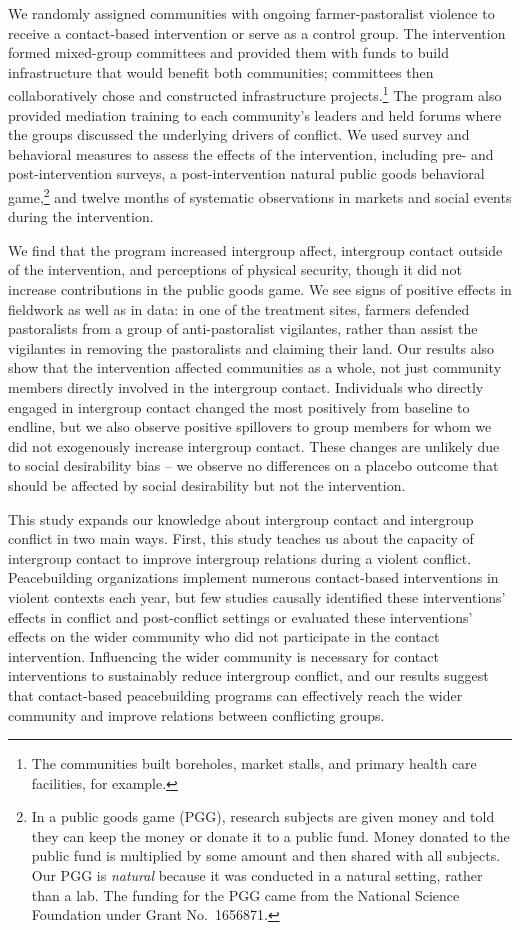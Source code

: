 \documentclass[11pt]{article}
\begin{document}
We randomly assigned communities with ongoing farmer-pastoralist
violence to receive a contact-based intervention or serve as a control
group. The intervention formed mixed-group committees and provided them
with funds to build infrastructure that would benefit both communities;
committees then collaboratively chose and constructed infrastructure
projects.\footnote{The communities built boreholes, market stalls, and
  primary health care facilities, for example.} The program also
provided mediation training to each community's leaders and held forums
where the groups discussed the underlying drivers of conflict. We used
survey and behavioral measures to assess the effects of the
intervention, including pre- and post-intervention surveys, a
post-intervention natural public goods behavioral game,\footnote{In a
  public goods game (PGG), research subjects are given money and told
  they can keep the money or donate it to a public fund. Money donated
  to the public fund is multiplied by some amount and then shared with
  all subjects. Our PGG is \emph{natural} because it was conducted in a
  natural setting, rather than a lab. The funding for the PGG came from
  the National Science Foundation under Grant No.~1656871.} and twelve
months of systematic observations in markets and social events during
the intervention.

We find that the program increased intergroup affect, intergroup contact
outside of the intervention, and perceptions of physical security,
though it did not increase contributions in the public goods game. We
see signs of positive effects in fieldwork as well as in data: in one of
the treatment sites, farmers defended pastoralists from a group of
anti-pastoralist vigilantes, rather than assist the vigilantes in
removing the pastoralists and claiming their land. Our results also show
that the intervention affected communities as a whole, not just
community members directly involved in the intergroup contact.
Individuals who directly engaged in intergroup contact changed the most
positively from baseline to endline, but we also observe positive
spillovers to group members for whom we did not exogenously increase
intergroup contact. These changes are unlikely due to social
desirability bias -- we observe no differences on a placebo outcome that
should be affected by social desirability but not the intervention.

This study expands our knowledge about intergroup contact and intergroup
conflict in two main ways. First, this study teaches us about the
capacity of intergroup contact to improve intergroup relations during a
violent conflict. Peacebuilding organizations implement numerous
contact-based interventions in violent contexts each year, but few
studies causally identified these interventions' effects in conflict and
post-conflict settings or evaluated these interventions' effects on the
wider community who did not participate in the contact intervention.
Influencing the wider community is necessary for contact interventions
to sustainably reduce intergroup conflict, and our results suggest that
contact-based peacebuilding programs can effectively reach the wider
community and improve relations between conflicting groups.
\end{document}
